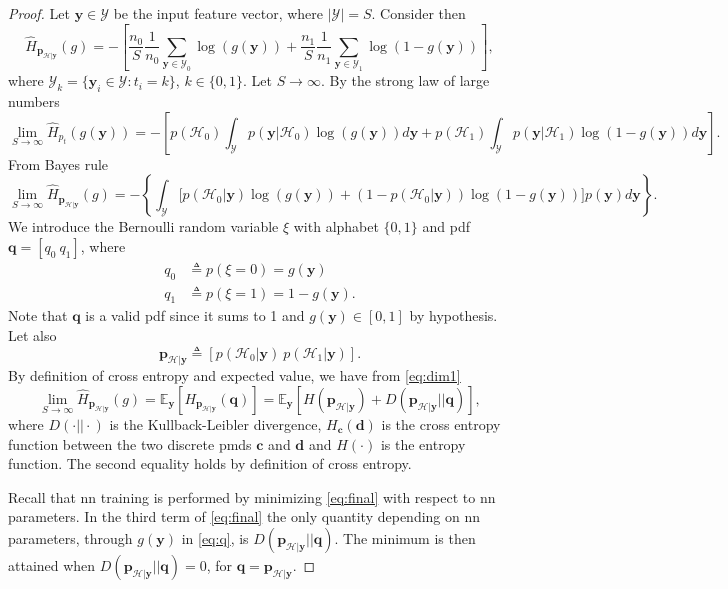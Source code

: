 \documentclass[conference,draftcls,onecolumn]{IEEEtran}
\newcommand{\cross}[2]{H_{#1}(#2)}
\newcommand{\hatcross}[2]{\hat{H}_{#1}(#2)}
\newcommand{\gy}{g(\bm y)}
\newcommand{\E}[2]{\mathbb{E}_{#1}\left[#2\right]}
\begin{document}
\begin{proof}
Let $\bm y \in \mathcal{Y}$ be the input feature vector, where $|\mathcal{Y}|=S$. Consider then 
\begin{equation}
	\hatcross{\bm p_{\mathcal{H}|\bm y}}{g} = - \left[ \frac{n_0}{S} \frac{1}{n_0} \sum_{\bm y \in \mathcal{Y}_0} \log(\gy) 
		+ \frac{n_1}{S} \frac{1}{n_1} \sum_{\bm y \in \mathcal{Y}_1} \log(1-\gy) \right],	
\end{equation}
where $\mathcal{Y}_k = \{\bm y_i \in \mathcal{Y} : t_i = k\}$, $k \in \{0,1\}$.
Let $S \to \infty$. By the strong law of large numbers \cite{etemadi1981elementary}
\begin{equation}
	\lim_{S \to \infty}	\hatcross{p_t}{\gy} = - \left[ p(\mathcal{H}_0) \int_{\mathcal{Y}} p(\bm y|\mathcal{H}_0) \log (\gy) d\bm y + 
		 p(\mathcal{H}_1) \int_{\mathcal{Y}} p(\bm y|\mathcal{H}_1) \log (1-\gy) d\bm y \right]. 
\end{equation}
From Bayes rule
\begin{equation}
\label{eq:dim1}
\lim_{S \to \infty}	\hatcross{\bm p_{\mathcal{H}|\bm y}}{g} = - \left\{ \int_{\mathcal{Y}} \bigl[ p(\mathcal{H}_0|\bm y) \log(\gy) + 
	(1-p(\mathcal{H}_0|\bm y)) \log(1-\gy)\bigr] p(\bm y)   d\bm y \right\}. 		
\end{equation}
We introduce the Bernoulli random variable $\xi$ with alphabet $ \{0,1\}$ and \ac{pdf} $\bm q = [q_0 \ q_1]$, where
\begin{subequations}
\label{eq:q}
\begin{align}
	q_0 &\triangleq p(\xi=0)=\gy \\
	q_1 &\triangleq p(\xi=1)=1-\gy.
\end{align}
\end{subequations}
Note that $\bm q$ is a valid \ac{pdf} since it sums to 1 and $\gy \in [0,1]$ by hypothesis. Let also 
\begin{equation}
	\bm p_{\mathcal{H}|\bm y} \triangleq [p(\mathcal{H}_0|\bm y)\ p(\mathcal{H}_1|\bm y)].	
\end{equation}
By definition of cross entropy and expected value, we have from \eqref{eq:dim1}
\begin{equation}
\label{eq:final}
	\lim_{S \to \infty}	\hatcross{\bm p_{\mathcal{H}|\bm y}}{g} =	\E{\bm y}{ \cross{\bm p_{\mathcal{H}|\bm y}}{\bm q}} = 
		\E{\bm y}{H (\bm p_{\mathcal{H}|\bm y}) + D(\bm p_{\mathcal{H}|\bm y}||\bm q)},
\end{equation}
where $D(\cdot||\cdot)$ is the Kullback-Leibler divergence, $H_{\bm c}(\bm d)$ is the cross entropy function between the two discrete \acp{pmd} $\bm c$ and $\bm d$ and $H(\cdot)$ is the entropy function. The second equality holds by definition of cross entropy.

Recall that \ac{nn} training is performed by minimizing \eqref{eq:final} with respect to \ac{nn} parameters. In the third term of \eqref{eq:final} the only quantity depending on \ac{nn} parameters, through $\gy$ in \eqref{eq:q}, is $D(\bm p_{\mathcal{H}|\bm y}||\bm q)$. The minimum is then attained when $D(\bm p_{\mathcal{H}|\bm y}||\bm q)=0$, for $\bm q = \bm p_{\mathcal{H}|\bm y}$.
\end{proof}
\end{document}
